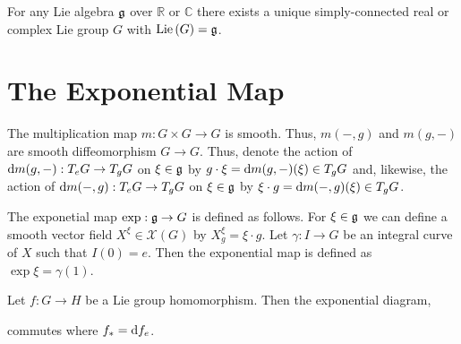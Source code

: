 \documentclass[12pt]{article}
\newcommand{\R}{\mathbb{R}}
\newcommand{\C}{\mathbb{C}}
\begin{document}
\newcommand{\Lie}[1]{\mathrm{Lie}\left( #1 \right)}


\begin{theorem}[Lie]
For any Lie algebra $\mathfrak{g}$ over $\R$ or $\C$ there exists a unique simply-connected real or complex Lie group $G$ with $\Lie{G} = \g$.
\end{theorem}

\section{The Exponential Map}

\begin{definition}
The multiplication map $m : G \times G \to G$ is smooth. Thus, $m(-,g)$ and $m(g,-)$ are smooth diffeomorphism $G \to G$. Thus, denote the action of $\mathrm{d}{m(g,-)} : T_e G \to T_g G$ on $\xi \in \mathfrak{g}$ by $g \cdot \xi = \mathrm{d}{m(g,-)}(\xi) \in T_g G$ and, likewise, the action of $\mathrm{d}{m(-,g)} : T_e G \to T_g G$ on $\xi \in \mathfrak{g}$ by $\xi \cdot g = \mathrm{d}{m(-,g)}(\xi) \in T_g G$. 
\end{definition}

\begin{definition}
The exponetial map $\exp : \mathfrak{g} \to G$ is defined as follows. For $\xi \in \mathfrak{g}$ we can define a smooth vector field $X^{\xi} \in \mathscr{X}(G)$ by $X^{\xi}_g = \xi \cdot g$. Let $\gamma : I \to G$ be an integral curve of $X$ such that $I(0) = e$. Then the exponential map is defined as $\exp{\xi} = \gamma(1)$. 
\end{definition}

\begin{proposition}
Let $f : G \to H$ be a Lie group homomorphism. Then the exponential diagram,
\begin{center}
\end{center}
commutes where $f_* = \mathrm{d}{f}_e$. 
\end{proposition}
\end{document}
